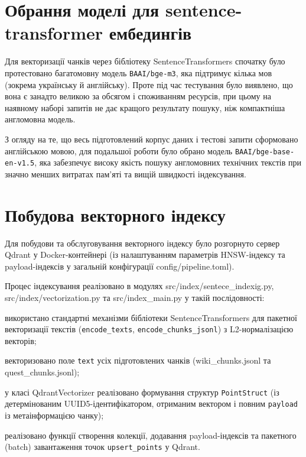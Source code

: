 \section{Обрання моделі для sentence-transformer ембедингів}

Для векторизації чанків через бібліотеку SentenceTransformers спочатку було протестовано багатомовну модель \texttt{BAAI/bge-m3}, яка підтримує кілька мов (зокрема українську й англійську). Проте під час тестування було виявлено, що вона є занадто великою за обсягом і споживанням ресурсів, при цьому на наявному наборі запитів не дає кращого результату пошуку, ніж компактніша англомовна модель.

З огляду на те, що весь підготовлений корпус даних і тестові запити сформовано англійською мовою, для подальшої роботи було обрано модель \texttt{BAAI/bge-base-en-v1.5}, яка забезпечує високу якість пошуку англомовних технічних текстів при значно менших витратах пам'яті та вищій швидкості індексування.

\section{Побудова векторного індексу}

Для побудови та обслуговування векторного індексу було розгорнуто сервер Qdrant у Docker-контейнері (із налаштуванням параметрів HNSW-індексу та payload-індексів у загальній конфігурації config/pipeline.toml).

Процес індексування реалізовано в модулях src/index/sentece\_indexig.py, src/index/vectorization.py та src/index\_main.py у такій послідовності:
\begin{dashlist}[wide]
    \item використано стандартні механізми бібліотеки SentenceTransformers для пакетної векторизації текстів (\texttt{encode\_texts}, \texttt{encode\_chunks\_jsonl}) з L2-нормалізацією векторів;
    \item векторизовано поле \texttt{text} усіх підготовлених чанків (wiki\_chunks.jsonl та quest\_chunks.jsonl);
    \item у класі QdrantVectorizer реалізовано формування структур \texttt{PointStruct} (із детермінованим UUID5-ідентифікатором, отриманим вектором і повним \texttt{payload} із метаінформацією чанку);
    \item реалізовано функції створення колекції, додавання payload-індексів та пакетного (batch) завантаження точок \texttt{upsert\_points} у Qdrant.
\end{dashlist}

